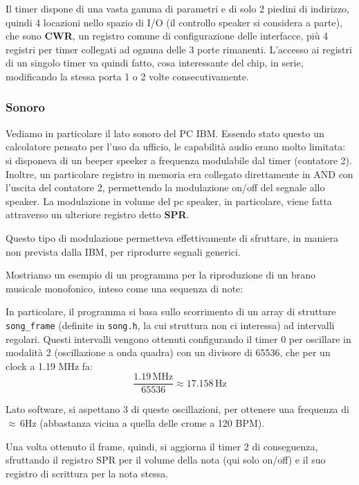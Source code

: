 \documentclass[a4paper,11pt]{article}
\begin{document}
Il timer dispone di una vasta gamma di parametri e di solo 2 piedini di indirizzo, quindi 4 locazioni nello spazio di I/O (il controllo speaker si considera a parte), che sono \textbf{CWR}, un registro comune di configurazione delle interfacce, più 4 registri per timer collegati ad ognuna delle 3 porte rimanenti.
L'accesso ai registri di un singolo timer va quindi fatto, cosa interessante del chip, in serie, modificando la stessa porta 1 o 2 volte consecutivamente.

\subsubsection{Sonoro}
Vediamo in particolare il lato sonoro del PC IBM.
Essendo stato questo un calcolatore pensato per l'uso da ufficio, le capabilità audio erano molto limitata: si disponeva di un beeper speeker a frequenza modulabile dal timer (contatore 2).
Inoltre, un particolare registro in memoria era collegato direttamente in AND con l'uscita del contatore 2, permettendo la modulazione on/off del segnale allo speaker.
La modulazione in volume del pc speaker, in particolare, viene fatta attraverso un ulteriore registro detto \textbf{SPR}.

Questo tipo di modulazione permetteva effettivamente di sfruttare, in maniera non prevista dalla IBM, per riprodurre segnali generici.

Mostriamo un esempio di un programma per la riproduzione di un brano musicale monofonico, inteso come una sequenza di note:



In particolare, il programma si basa sullo scorrimento di un array di strutture \lstinline|song_frame| (definite in \lstinline|song.h|, la cui struttura non ci interessa) ad intervalli regolari.
Questi intervalli vengono ottenuti configurando il timer 0 per oscillare in modalità 2 (oscillazione a onda quadra) con un divisore di 65536, che per un clock a 1.19 MHz fa:
$$
\frac{1.19 \, \mathrm{MHz}}{65536} \approx 17.158 \, \mathrm{Hz}
$$

Lato software, si aspettano 3 di queste oscillazioni, per ottenere una frequenza di $\approx \, 6 \mathrm{Hz}$ (abbastanza vicina a quella delle crome a 120 BPM).

Una volta ottenuto il frame, quindi, si aggiorna il timer 2 di conseguenza, sfruttando il registro SPR per il volume della nota (qui solo on/off) e il suo registro di scrittura per la nota stessa.
\end{document}
